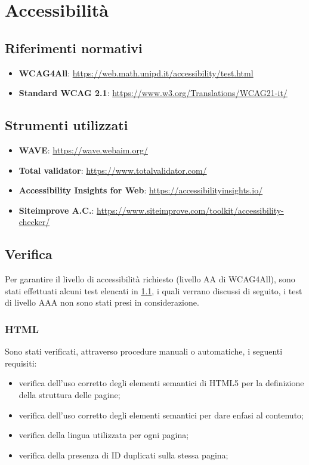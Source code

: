 \section{Accessibilità}
\label{sec:accessibility}

\subsection{Riferimenti normativi}
\label{subsec:accessibility-norms}

\begin{itemize}
    \item \textbf{WCAG4All}: \url{https://web.math.unipd.it/accessibility/test.html}
    \item \textbf{Standard WCAG 2.1}: \url{https://www.w3.org/Translations/WCAG21-it/}
\end{itemize}

\subsection{Strumenti utilizzati}
\begin{itemize}
    \item \textbf{WAVE}: \url{https://wave.webaim.org/}
    \item \textbf{Total validator}: \url{https://www.totalvalidator.com/}
    \item \textbf{Accessibility Insights for Web}: \url{https://accessibilityinsights.io/}
    \item \textbf{Siteimprove A.C.}: \url{https://www.siteimprove.com/toolkit/accessibility-checker/}
\end{itemize}

\subsection{Verifica}
\label{subsec:accessibility-verification}

Per garantire il livello di accessibilità richiesto (livello AA di WCAG4All), sono stati effettuati alcuni test elencati in \ref{subsec:accessibility-norms}, i quali verrano discussi di seguito, i test di livello AAA non sono stati presi in considerazione.

\subsubsection{HTML}
\label{subsubsec:accessibility-html}

Sono stati verificati, attraverso procedure manuali o automatiche, i seguenti requisiti:
\begin{itemize}
    \item verifica dell'uso corretto degli elementi semantici di HTML5 per la definizione della struttura delle pagine;
    \item verifica dell'uso corretto degli elementi semantici per dare enfasi al contenuto;
    \item verifica della lingua utilizzata per ogni pagina;
    \item verifica della presenza di ID duplicati sulla stessa pagina;
\end{itemize}

